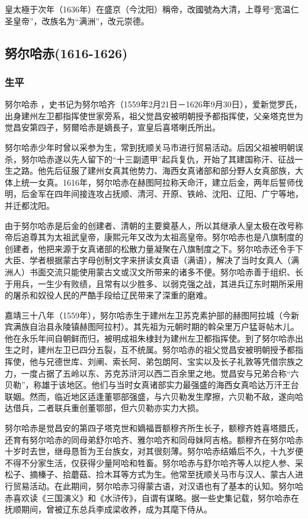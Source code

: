 皇太極于次年（1636年）在盛京（今沈阳）稱帝，改國號為大清，上尊号“宽温仁圣皇帝”，改族名为“满洲”，改元崇德。

\subsection{努尔哈赤\tiny(1616-1626)}

\subsubsection{生平}

努尔哈赤 ，史书记为努尔哈齐（1559年2月21日－1626年9月30日），爱新觉罗氏，出身建州左卫都指挥使世家旁系，祖父觉昌安被明朝授予都指挥使，父亲塔克世为觉昌安第四子，努爾哈赤是嫡長子，宣皇后喜塔喇氏所出。

努尔哈赤少年时曾以采参为生，常到抚顺关马市进行贸易活动。后因父祖被明朝误杀，努尔哈赤遂以先人留下的“十三副遗甲”起兵复仇，开始了其建国称汗、征战一生之路。他先后征服了建州女真其他势力、海西女真诸部和部分野人女真部族，大体上统一女真。1616年，努尔哈赤在赫图阿拉称天命汗，建立后金，两年后誓师伐明，后金军在四年间接连攻占抚顺、清河、开原、铁岭、沈阳、辽阳、广宁等地，并迁都沈阳。

由于努尔哈赤是后金的创建者、清朝的主要奠基人，所以其继承人皇太极在改号称帝后追尊其为太祖武皇帝，康熙元年又改为太祖高皇帝。努尔哈赤也是八旗制度的创建者，他把来源于女真诸部的松散力量凝聚在八旗制度之下。努尔哈赤还令手下大臣、学者根据蒙古字母创制文字来拼读女真语（满语），解决了当时女真人（满洲人）书面交流只能使用蒙古文或汉文所带来的诸多不便。努尔哈赤善于组织、长于用兵，一生少有败绩，且常有以少胜多、以弱克强之战，其进兵辽东时期所采用的屠杀和奴役人民的严酷手段给辽民带来了深重的磨难。

嘉靖三十八年（1559年），努尔哈赤生于建州左卫苏克素护部的赫图阿拉城（今新宾满族自治县永陵镇赫图阿拉村）。其先祖为元朝时期的斡朵里万户猛哥帖木儿。他在永乐年间自朝鲜而归，被明成祖朱棣封为建州左卫都指挥使。到了努尔哈赤出生之时，建州左卫已四分五裂，互不统属。努尔哈赤的祖父觉昌安被明朝授予都指挥使，他与兄德世库、刘阐、索长阿、弟包朗阿、宝实以及长子礼敦等凭借宗族之力，一度占据了五岭以东、苏克苏浒河以西二百余里之地。觉昌安与兄弟合称“六贝勒”，称雄于该地区。他们与当时女真诸部实力最强盛的海西女真哈达万汗王台联姻。然而，临近地区适逢董鄂部强盛，与六贝勒发生摩擦，六贝勒不敌，遂向哈达借兵，二者联兵重创董鄂部，但六贝勒亦实力大损。

努尔哈赤是觉昌安的第四子塔克世和嫡福晋额穆齐所生长子，额穆齐姓喜塔腊氏，还育有努尔哈赤的同母弟舒尔哈齐、雅尔哈齐和同母妹阿吉格。额穆齐在努尔哈赤十岁时去世，继母恳哲为王台族女，对其很刻薄。努尔哈赤结婚后不久，十九岁便不得不分家生活，仅获得少量阿哈和牲畜。努尔哈赤与舒尔哈齐等人以挖人参、采松子、摘榛子、拾蘑菇、捡木耳等方式为生。他常至抚顺关马市与汉人、蒙古人进行贸易活动。在此期间，努尔哈赤习得蒙古语，对汉语也有了基本的认知。努尔哈赤喜欢读《三国演义》和《水浒传》，自谓有谋略。据一些史集记载，努尔哈赤在抚顺期间，曾被辽东总兵李成梁收养，成为其麾下侍从。

